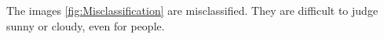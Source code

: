 The images \ref{fig:Misclassification} are misclassified. They are difficult to judge sunny or cloudy, even for people.
\graphicspath{ {./Figures/} }
\begin{figure}[htb]
    \centering
\end{figure}
